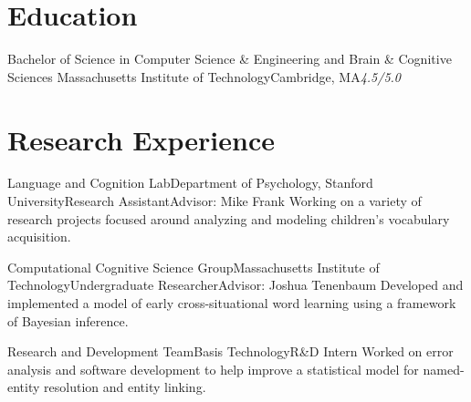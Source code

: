 \documentclass[11pt,letter]{moderncv}
\begin{document}
\maketitle

\vspace*{-2\baselineskip}

\section{Education}

{Bachelor of Science in Computer Science \& Engineering and Brain \& Cognitive Sciences}
{Massachusetts Institute of Technology}{Cambridge, MA}{\textit{4.5/5.0}}{}


\section{Research Experience}

{Language and Cognition Lab}{Department of Psychology, Stanford University}{Research Assistant}{Advisor: Mike Frank}{
%
Working on a variety of research projects focused around analyzing and modeling children's vocabulary acquisition.
%
}
\vspace*{0.25em}

{Computational Cognitive Science Group}{Massachusetts Institute of Technology}{Undergraduate Researcher}{Advisor: Joshua Tenenbaum}{
%
Developed and implemented a model of early cross-situational word learning using a framework of Bayesian inference.
%
}
\vspace*{0.25em}

\raggedright
{}
{Research and Development Team}{Basis Technology}{R\&D Intern}{}{
%
Worked on error analysis and software development to help improve a statistical model for named-entity resolution and entity linking.
%
}
\vspace*{0.25em}
\end{document}
